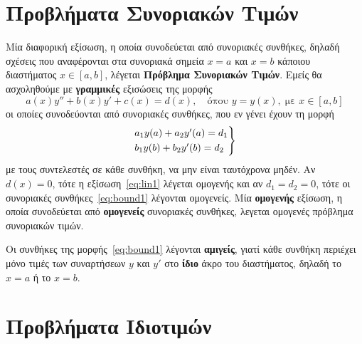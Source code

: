 






\section*{Προβλήματα Συνοριακών Τιμών}

Μία διαφορική εξίσωση, η οποία συνοδεύεται από \textcolor{Col1}{συνοριακές συνθήκες}, 
δηλαδή σχέσεις που αναφέρονται στα συνοριακά σημεία $ x=a $ και $ x=b $ κάποιου 
διαστήματος $x \in [a,b]$, λέγεται \textbf{Πρόβλημα Συνοριακών Τιμών}. 
Εμείς θα ασχοληθούμε με \textbf{γραμμικές} εξισώσεις της μορφής
\begin{equation}\label{eq:lin1}
  a(x)y'' + b(x) y'+ c(x)=d(x), \quad \text{όπου } y=y(x), \; \text{με } x \in [a,b] 
\end{equation}
οι οποίες συνοδεύονται από συνοριακές συνθήκες, που εν γένει έχουν τη μορφή
\begin{gather}\label{eq:bound1}
  \begin{rcases}
    a_{1} y(a) + a_{2} y'(a) = d_{1} \\
    b_{1} y(b) + b_{2} y'(b) = d_{2}
  \end{rcases}
\end{gather}
με τους συντελεστές σε κάθε συνθήκη, να μην είναι ταυτόχρονα μηδέν.
Αν $ d(x)=0 $, τότε η εξίσωση~\eqref{eq:lin1} λέγεται \textcolor{Col1}{ομογενής} και αν 
$ d_{1}= d_{2}= 0 $, τότε οι συνοριακές συνθήκες~\eqref{eq:bound1} λέγονται
\textcolor{Col1}{ομογενείς}. Μία \textbf{ομογενής} εξίσωση, η οποία συνοδεύεται από 
\textbf{ομογενείς} συνοριακές συνθήκες, λεγεται \textcolor{Col1}{ομογενές πρόβλημα 
συνοριακών τιμών}.

\begin{rem}
 Οι συνθήκες της μορφής~\eqref{eq:bound1} λέγονται \textbf{αμιγείς}, γιατί κάθε συνθήκη 
 περιέχει μόνο τιμές των συναρτήσεων $ y $ και $ y' $ στο \textbf{ίδιο} άκρο του 
 διαστήματος, δηλαδή το $ x=a $ ή το $ x=b $.
\end{rem}


\section*{Προβλήματα Ιδιοτιμών}

